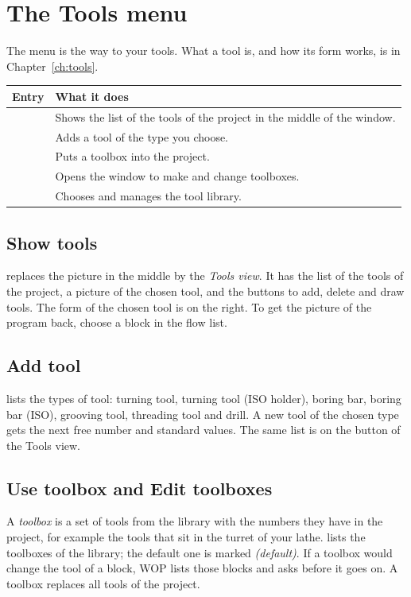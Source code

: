 \chapter{The Tools menu}\label{ch:tools_menu}

The  menu is the way to your tools. What a tool is, and how its form works, is in Chapter~\ref{ch:tools}.

\begin{center}
\begin{tabularx}{\textwidth}{@{}l Y@{}}
\toprule
\textbf{Entry} & \textbf{What it does} \\
\midrule
{} & Shows the list of the tools of the project in the middle of the window. \\
 & Adds a tool of the type you choose. \\
 & Puts a toolbox into the project. \\
 & Opens the window to make and change toolboxes. \\
 & Chooses and manages the tool library. \\
\bottomrule
\end{tabularx}
\end{center}

\section{Show tools}
 replaces the picture in the middle by the \emph{Tools view}. It has the list of the tools of the project, a picture of the chosen tool, and the buttons to add, delete and draw tools. The form of the chosen tool is on the right. To get the picture of the program back, choose a block in the flow list.

\section{Add tool}
 lists the types of tool: turning tool, turning tool (ISO holder), boring bar, boring bar (ISO), grooving tool, threading tool and drill. A new tool of the chosen type gets the next free number and standard values. The same list is on the button  of the Tools view.

\section{Use toolbox and Edit toolboxes}
A \emph{toolbox} is a set of tools from the library with the numbers they have in the project, for example the tools that sit in the turret of your lathe.  lists the toolboxes of the library; the default one is marked \emph{(default)}. If a toolbox would change the tool of a block, WOP lists those blocks and asks before it goes on. A toolbox replaces all tools of the project.

